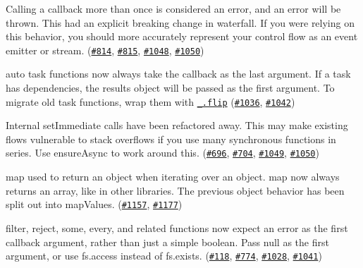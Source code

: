 \begin{DoxyItemize}
\item Calling a callback more than once is considered an error, and an error will be thrown. This had an explicit breaking change in {\ttfamily waterfall}. If you were relying on this behavior, you should more accurately represent your control flow as an event emitter or stream. (\href{https://github.com/caolan/async/issues/814}{\tt \#814}, \href{https://github.com/caolan/async/issues/815}{\tt \#815}, \href{https://github.com/caolan/async/issues/1048}{\tt \#1048}, \href{https://github.com/caolan/async/issues/1050}{\tt \#1050})
\item {\ttfamily auto} task functions now always take the callback as the last argument. If a task has dependencies, the {\ttfamily results} object will be passed as the first argument. To migrate old task functions, wrap them with \href{https://lodash.com/docs#flip}{\tt {\ttfamily \+\_\+.\+flip}} (\href{https://github.com/caolan/async/issues/1036}{\tt \#1036}, \href{https://github.com/caolan/async/issues/1042}{\tt \#1042})
\item Internal {\ttfamily set\+Immediate} calls have been refactored away. This may make existing flows vulnerable to stack overflows if you use many synchronous functions in series. Use {\ttfamily ensure\+Async} to work around this. (\href{https://github.com/caolan/async/issues/696}{\tt \#696}, \href{https://github.com/caolan/async/issues/704}{\tt \#704}, \href{https://github.com/caolan/async/issues/1049}{\tt \#1049}, \href{https://github.com/caolan/async/issues/1050}{\tt \#1050})
\item {\ttfamily map} used to return an object when iterating over an object. {\ttfamily map} now always returns an array, like in other libraries. The previous object behavior has been split out into {\ttfamily map\+Values}. (\href{https://github.com/caolan/async/issues/1157}{\tt \#1157}, \href{https://github.com/caolan/async/issues/1177}{\tt \#1177})
\item {\ttfamily filter}, {\ttfamily reject}, {\ttfamily some}, {\ttfamily every}, and related functions now expect an error as the first callback argument, rather than just a simple boolean. Pass {\ttfamily null} as the first argument, or use {\ttfamily fs.\+access} instead of {\ttfamily fs.\+exists}. (\href{https://github.com/caolan/async/issues/118}{\tt \#118}, \href{https://github.com/caolan/async/issues/774}{\tt \#774}, \href{https://github.com/caolan/async/issues/1028}{\tt \#1028}, \href{https://github.com/caolan/async/issues/1041}{\tt \#1041})

\end{DoxyItemize}
